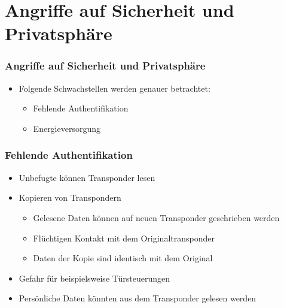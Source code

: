 \documentclass{beamer}
\begin{document}
\section{Angriffe auf Sicherheit und Privatsphäre}
\begin{frame}
\frametitle{Angriffe auf Sicherheit und Privatsphäre}

\begin{itemize}
	\item Folgende Schwachstellen werden genauer betrachtet:
	\begin{itemize}
		\item Fehlende Authentifikation
		\item Energieversorgung
	\end{itemize}
\end{itemize}
\end{frame}


\begin{frame}
\frametitle{Fehlende Authentifikation}

\begin{itemize}
	\item Unbefugte können Transponder lesen
	\item Kopieren von Transpondern
	\begin{itemize}
		\item Gelesene Daten können auf neuen Transponder geschrieben werden
		\item Flüchtigen Kontakt mit dem Originaltransponder 
		\item Daten der Kopie sind identisch mit dem Original
	\end{itemize}
	\item Gefahr für beispielsweise Türsteuerungen
	\item Persönliche Daten könnten aus dem Transponder gelesen werden
\end{itemize}
\end{frame}
\end{document}

